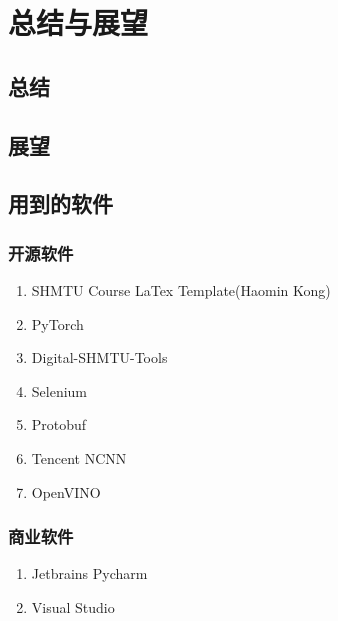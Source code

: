 \chapter{总结与展望}
\label{chapter:11}

\section{总结}

\section{展望}

\section{用到的软件}

\subsection{开源软件}

\begin{enumerate}
	\item SHMTU Course LaTex Template(Haomin Kong)\cite{shmtu_course_latex_template}
	\item PyTorch\cite{pytorch}
	\item Digital-SHMTU-Tools\cite{digit_shmtu}
	\item Selenium
	\item Protobuf
	\item Tencent NCNN
	\item OpenVINO
\end{enumerate}

\subsection{商业软件}

\begin{enumerate}
	\item Jetbrains Pycharm
	\item Visual Studio
\end{enumerate}

